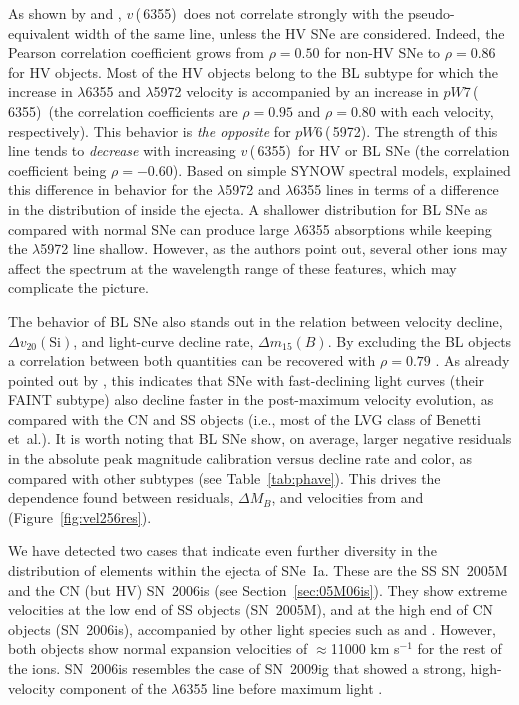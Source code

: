 \documentclass[apj]{emulateapj-rtx4}
\newcommand{\pwsix}{$pW$6\,(\ion{Si}{2}\,5972)}
\newcommand{\pwseven}{$pW$7\,(\ion{Si}{2}\,6355)}
\newcommand{\vsix}{$v$\,(\ion{Si}{2}\,6355)}
\newcommand{\dm}{$\Delta m_{15}(B)$}
\newcommand{\deltav}{$\Delta v_{20}(\mathrm{Si})$}
\newcommand{\sneia}{SNe~Ia}
\begin{document}
As shown by \citet{wang09} and \citet{blondin12}, \vsix\ does not
correlate strongly with the pseudo-equivalent width of the same line,
unless the HV SNe are considered. Indeed, the Pearson correlation
coefficient grows from $\rho=0.50$ for non-HV SNe to $\rho=0.86$ for HV
objects. Most of the HV objects belong to the BL subtype 
for which the increase in 
$\lambda$6355 and  $\lambda$5972 velocity is accompanied by
an increase in 
\pwseven\ (the correlation coefficients are $\rho=0.95$ and
$\rho=0.80$ with each velocity, respectively). This behavior is {\em
  the opposite} for \pwsix. The strength of this line tends to {\em
  decrease} with increasing \vsix\ for HV or BL SNe (the correlation
coefficient being $\rho=-0.60$). Based on simple SYNOW spectral models,
\citet{branch09} explained this difference in behavior for the
 $\lambda$5972 and $\lambda$6355 lines in terms of a difference in
the distribution of  inside the ejecta. A shallower
distribution for BL SNe as compared with normal SNe can produce large
 $\lambda$6355 absorptions while keeping the 
$\lambda$5972 line
shallow. However, as the authors point out, several other ions may
affect the spectrum at the wavelength range of these features, which
may complicate the picture. 

The behavior of BL SNe also stands out in the relation between
velocity decline, \deltav, and light-curve decline rate, \dm. By
excluding the BL objects a correlation between both quantities can be
recovered with $\rho=0.79$ \citep[cf.][]{blondin12}. As already
pointed out by \citet{benetti05}, this indicates that SNe with
fast-declining light curves (their FAINT subtype) also decline faster
in the  post-maximum velocity evolution, as compared with
the CN and SS objects (i.e., most of the LVG class of Benetti
et~al.). It is worth noting that BL SNe show, on average, larger negative
residuals in the absolute peak magnitude calibration versus decline
rate and color, as compared with other subtypes (see
Table~\ref{tab:phave}). This drives the dependence found between
residuals, $\Delta M_B$, and velocities from  and
 (Figure~\ref{fig:vel256res}).  
 
We have detected two cases that indicate even further diversity in the
distribution of elements within the ejecta of \sneia. These are the SS
SN~2005M and the CN (but HV) SN~2006is (see
Section~\ref{sec:05M06is}). They show extreme  velocities
at the low end of SS objects (SN~2005M), and at the high end of CN
objects (SN~2006is), accompanied by other light species such as  and
. However, both objects show normal expansion velocities of
$\approx$11000 km s$^{-1}$ for the rest of the ions. SN~2006is
resembles the case of SN~2009ig that showed a strong, high-velocity
component of the  $\lambda$6355 line before maximum
light \citep{foley12}. 
\end{document}
